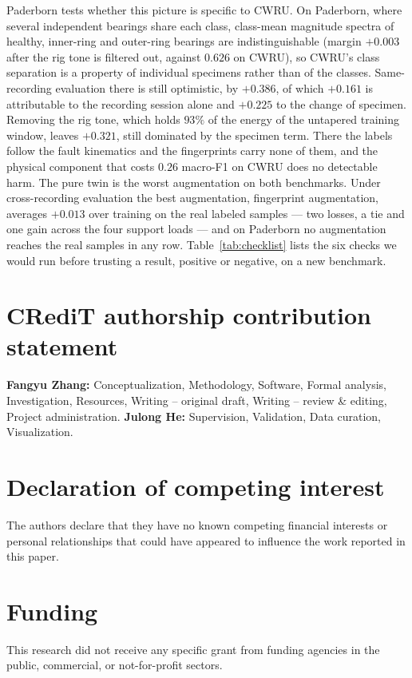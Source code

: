 \documentclass[preprint,12pt]{elsarticle}
\begin{document}
Paderborn tests whether this picture is specific to CWRU. On
Paderborn, where several independent bearings share each class, class-mean
magnitude spectra of healthy, inner-ring and outer-ring bearings are
indistinguishable (margin $+0.003$ after the rig tone is filtered out, against
$0.626$ on CWRU), so CWRU's class separation is a property of individual
specimens rather than of the classes. Same-recording evaluation there is still
optimistic, by $+0.386$, of which $+0.161$ is attributable to the recording
session alone and $+0.225$ to the change of specimen. Removing the rig tone,
which holds $93\%$ of the energy of the untapered training window, leaves $+0.321$, still dominated by
the specimen term. There the
labels follow the fault kinematics and the fingerprints carry none of them, and
the physical component that costs $0.26$ macro-F1 on CWRU does no detectable
harm. The pure twin is the worst augmentation on both benchmarks. Under
cross-recording evaluation the best augmentation, fingerprint augmentation,
averages $+0.013$ over training on the real labeled samples --- two losses, a
tie and one gain across the four support loads --- and on Paderborn no
augmentation reaches the real samples in any row. Table~\ref{tab:checklist}
lists the six checks we would run before trusting a result, positive or
negative, on a new benchmark.

\section*{CRediT authorship contribution statement}
\textbf{Fangyu Zhang:} Conceptualization, Methodology, Software, Formal analysis,
Investigation, Resources, Writing -- original draft, Writing -- review \& editing,
Project administration.
\textbf{Julong He:} Supervision, Validation, Data curation, Visualization.

\section*{Declaration of competing interest}
The authors declare that they have no known competing financial interests or
personal relationships that could have appeared to influence the work reported
in this paper.

\section*{Funding}
This research did not receive any specific grant from funding agencies in the
public, commercial, or not-for-profit sectors.
\end{document}
